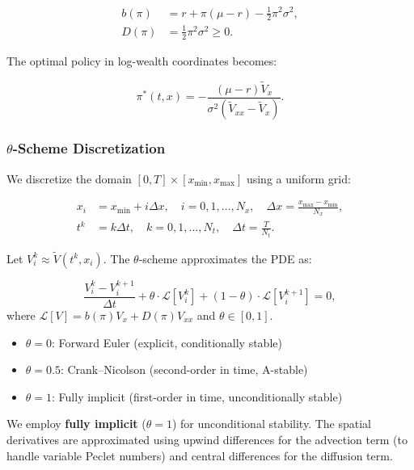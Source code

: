 \documentclass[12pt,a4paper]{article}
\newcommand{\Lp}{\mathcal{L}}
\begin{document}
\begin{align}
b(\pi) &= r + \pi(\mu - r) - \frac{1}{2} \pi^2 \sigma^2, \label{eq:drift}\\
D(\pi) &= \frac{1}{2} \pi^2 \sigma^2 \ge 0. \label{eq:diffusion}
\end{align}

The optimal policy in log-wealth coordinates becomes:

\begin{equation}
\label{eq:pi_log}
\pi^*(t, x) = -\frac{(\mu - r) \widetilde{V}_x}{\sigma^2 (\widetilde{V}_{xx} - \widetilde{V}_x)}.
\end{equation}

\subsubsection{$\theta$-Scheme Discretization}

We discretize the domain $[0, T] \times [x_{\min}, x_{\max}]$ using a uniform grid:

\begin{align}
x_i &= x_{\min} + i \Delta x, \quad i = 0, 1, \ldots, N_x, \quad \Delta x = \frac{x_{\max} - x_{\min}}{N_x},\\
t^k &= k \Delta t, \quad k = 0, 1, \ldots, N_t, \quad \Delta t = \frac{T}{N_t}.
\end{align}

Let $V_i^k \approx \widetilde{V}(t^k, x_i)$. The $\theta$-scheme approximates the PDE as:

\begin{equation}
\label{eq:theta_scheme}
\frac{V_i^{k} - V_i^{k+1}}{\Delta t} + \theta \cdot \Lp[V_i^{k}] + (1-\theta) \cdot \Lp[V_i^{k+1}] = 0,
\end{equation}
where $\Lp[V] = b(\pi) V_x + D(\pi) V_{xx}$ and $\theta \in [0,1]$.

\begin{itemize}
    \item $\theta = 0$: Forward Euler (explicit, conditionally stable)
    \item $\theta = 0.5$: Crank--Nicolson (second-order in time, A-stable)
    \item $\theta = 1$: Fully implicit (first-order in time, unconditionally stable)
\end{itemize}

We employ \textbf{fully implicit} ($\theta = 1$) for unconditional stability. The spatial derivatives are approximated using upwind differences for the advection term (to handle variable Peclet numbers) and central differences for the diffusion term.
\end{document}
